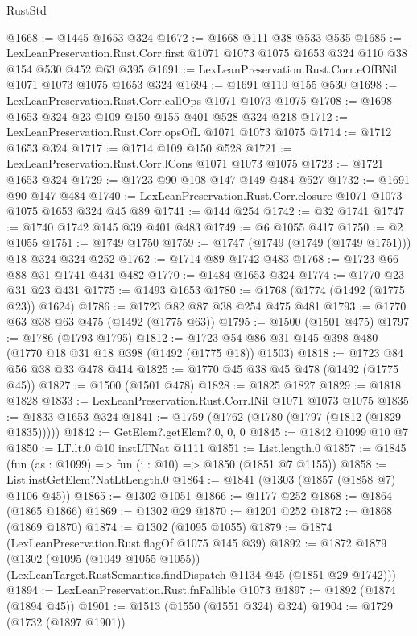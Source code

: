 \begin{lexlean}{RustStd}
\begin{coremodule}
{\begin{coremodule}
{{{{{{{{@1668 := @1445 @1653 @324
@1672 := @1668 @111 @38 @533 @535
@1685 := LexLeanPreservation.Rust.Corr.first
    @1071
    @1073
    @1075
    @1653
    @324
    @110
    @38
    @154
    @530
    @452
    @63
    @395
@1691 := LexLeanPreservation.Rust.Corr.eOfBNil @1071 @1073 @1075 @1653 @324
@1694 := @1691 @110 @155 @530
@1698 := LexLeanPreservation.Rust.Corr.callOps @1071 @1073 @1075
@1708 := @1698 @1653 @324 @23 @109 @150 @155 @401 @528 @324 @218
@1712 := LexLeanPreservation.Rust.Corr.opsOfL @1071 @1073 @1075
@1714 := @1712 @1653 @324
@1717 := @1714 @109 @150 @528
@1721 := LexLeanPreservation.Rust.Corr.lCons @1071 @1073 @1075
@1723 := @1721 @1653 @324
@1729 := @1723 @90 @108 @147 @149 @484 @527
@1732 := @1691 @90 @147 @484
@1740 := LexLeanPreservation.Rust.Corr.closure @1071 @1073 @1075 @1653 @324 @45 @89
@1741 := @144 @254
@1742 := @32 @1741
@1747 := @1740 @1742 @145 @39 @401 @483
@1749 := @6 @1055 @417
@1750 := @2 @1055
@1751 := @1749 @1750
@1759 := @1747 (@1749 (@1749 (@1749 @1751))) @18 @324 @324 @252
@1762 := @1714 @89 @1742 @483
@1768 := @1723 @66 @88 @31 @1741 @431 @482
@1770 := @1484 @1653 @324
@1774 := @1770 @23 @31 @23 @431
@1775 := @1493 @1653
@1780 := @1768 (@1774 (@1492 (@1775 @23)) @1624)
@1786 := @1723 @82 @87 @38 @254 @475 @481
@1793 := @1770 @63 @38 @63 @475 (@1492 (@1775 @63))
@1795 := @1500 (@1501 @475)
@1797 := @1786 (@1793 @1795)
@1812 := @1723 @54 @86 @31 @145 @398 @480 (@1770 @18 @31 @18 @398 (@1492 (@1775 @18)) @1503)
@1818 := @1723 @84 @56 @38 @33 @478 @414
@1825 := @1770 @45 @38 @45 @478 (@1492 (@1775 @45))
@1827 := @1500 (@1501 @478)
@1828 := @1825 @1827
@1829 := @1818 @1828
@1833 := LexLeanPreservation.Rust.Corr.lNil @1071 @1073 @1075
@1835 := @1833 @1653 @324
@1841 := @1759 (@1762 (@1780 (@1797 (@1812 (@1829 @1835)))))
@1842 := GetElem?.getElem?.{0, 0, 0}
@1845 := @1842 @1099 @10 @7
@1850 := LT.lt.{0} @10 instLTNat @1111
@1851 := List.length.{0}
@1857 := @1845 (fun (as : @1099) => fun (i : @10) => @1850 (@1851 @7 @1155))
@1858 := List.instGetElem?NatLtLength.{0}
@1864 := @1841 (@1303 (@1857 (@1858 @7) @1106 @45))
@1865 := @1302 @1051
@1866 := @1177 @252
@1868 := @1864 (@1865 @1866)
@1869 := @1302 @29
@1870 := @1201 @252
@1872 := @1868 (@1869 @1870)
@1874 := @1302 (@1095 @1055)
@1879 := @1874 (LexLeanPreservation.Rust.flagOf @1075 @145 @39)
@1892 := @1872
    @1879
    (@1302
      (@1095 (@1049 @1055 @1055))
      (LexLeanTarget.RustSemantics.findDispatch @1134 @45 (@1851 @29 @1742)))
@1894 := LexLeanPreservation.Rust.fnFallible @1073
@1897 := @1892 (@1874 (@1894 @45))
@1901 := @1513 (@1550 (@1551 @324) @324)
@1904 := @1729 (@1732 (@1897 @1901))
}}}}}}}}
\end{coremodule}}
\end{coremodule}
\end{lexlean}
